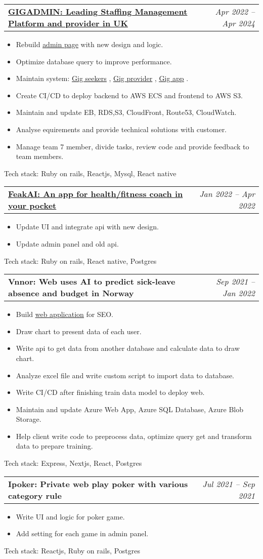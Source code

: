 \documentclass[letterpaper,11pt]{article}
\makeatletter
\newcommand{\resumeItem}[1]{
  \item\small{
    {#1 \vspace{-2pt}}
  }
}
\newcommand{\resumeSubheadingProject}[2]{
  \vspace{-2pt}\item
    \begin{tabular*}{0.97\textwidth}[t]{l@{\extracolsep{\fill}}r}
      \textbf{\small#1} & \textit{\small #2} \\
    \end{tabular*}\vspace{-7pt}
}
\newcommand{\resumeSubheadingProjectWithLink}[4]{
  \vspace{-2pt}\item
    \begin{tabular*}{0.97\textwidth}[t]{l@{\extracolsep{\fill}}r}
      \href{#1}{\textbf{\underline{#2}:{#3}}} & \textit{\small #4} \\
    \end{tabular*}\vspace{-7pt}
}
\newcommand{\resumeLink}[2]{
  \href{#1}{\underline{#2}}
}
\newcommand{\resumeItemListStart}{\begin{itemize}}
\newcommand{\resumeItemListEnd}{\end{itemize}\vspace{-5pt}}
\makeatother
\begin{document}
\resumeSubheadingProjectWithLink
{https://www.gigtogig.co.uk/}
{GIGADMIN}
{ Leading Staffing Management Platform and provider in UK}{Apr 2022 -- Apr 2024}
\resumeItemListStart
\resumeItem{ Rebuild\resumeLink{https://www.gigadmin.co.uk/login}{admin page}with new design and logic.}
\resumeItem{ Optimize database query to improve performance.}
\resumeItem{ Maintain system:\resumeLink{https://www.gigseekers.co.uk/main/login/}{Gig seekers},\resumeLink{https://www.gigprovider.co.uk/signin}{Gig provider},\resumeLink{https://play.google.com/store/apps/details?id=com.gigtogig.marketplace}{Gig app}.  }
\resumeItem{ Create CI/CD to deploy backend to AWS ECS and frontend to AWS S3.}
\resumeItem{ Maintain and update EB, RDS,S3, CloudFront, Route53, CloudWatch.}
\resumeItem{ Analyse equirements and provide technical solutions with customer.}
\resumeItem{ Manage team 7 member, divide tasks, review code and provide feedback to team members.}
\resumeItemListEnd
{Tech stack:}{ Ruby on rails, Reactjs, Mysql, React native}

\resumeSubheadingProjectWithLink
{https://play.google.com/store/apps/details?id=ai.feak\&hl=en}
{FeakAI}
{ An app for health/fitness coach in your pocket}{Jan 2022 -- Apr 2022}
\resumeItemListStart
\resumeItem{ Update UI and integrate api with new design.}
\resumeItem{ Update admin panel and old api.}
\resumeItemListEnd
{Tech stack:}{ Ruby on rails, React native, Postgres}

\resumeSubheadingProject
{Vnnor: Web uses AI to predict sick-leave absence and budget in Norway}{Sep 2021 -- Jan 2022}
\resumeItemListStart
\resumeItem{ Build\resumeLink{https://www.synplan.ai/}{web application}for SEO.}
\resumeItem{ Draw chart to present data of each user.}
\resumeItem{ Write api to get data from another database and calculate data to draw chart.}
\resumeItem{ Analyze excel file and write custom script to import data to database.}
\resumeItem{ Write CI/CD after finishing train data model to deploy web.}
\resumeItem{ Maintain and update Azure Web App, Azure SQL Database, Azure Blob Storage.}
\resumeItem{ Help client write code to preprocess data, optimize query get and transform data to prepare training.}
\resumeItemListEnd
{Tech stack:}{ Express, Nextjs, React, Postgres}

\resumeSubheadingProject
{Ipoker: Private web play poker with various category rule}{Jul 2021 -- Sep 2021}
\resumeItemListStart
\resumeItem{ Write UI and logic for poker game.}
\resumeItem{ Add setting for each game in admin panel.}
\resumeItemListEnd
{Tech stack:}{ Reactjs, Ruby on rails, Postgres}
\end{document}
